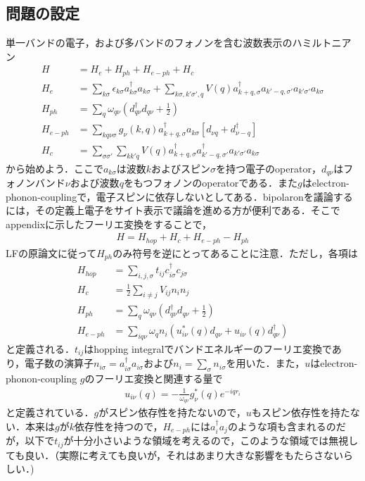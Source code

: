 \documentclass[a4j]{jarticle}
\begin{document}
\subsection{問題の設定}
単一バンドの電子，および多バンドのフォノンを含む波数表示のハミルトニアン
\begin{align}
 H&=H_e+H_{ph}+H_{e-ph}+H_c \\
 H_e&=\sum_{k\sigma}\epsilon_{k\sigma}a^{\dagger}_{k\sigma}a_{k\sigma}+\sum_{k\sigma,k'\sigma',q}V(q)a^{\dagger}_{k+q,\sigma}a_{k'-q,\sigma'}a_{k'\sigma'}a_{k\sigma} \\
 H_{ph}&=\sum_{q}\omega_{q\nu}\left(d^{\dagger}_{q\nu}d_{q\nu}+\frac{1}{2}\right) \\ 
　H_{e-ph}&=\sum_{kq\nu\sigma}g_{\nu}(k,q)a^{\dagger}_{k+q,\sigma}a_{k\sigma}\left[d_{\nu q}+d^{\dagger}_{\nu -q}\right] \\
H_c&=\sum_{\sigma\sigma'}\sum_{kk'q}V(q)a^{\dagger}_{k+q,\sigma}a^{\dagger}_{k'-q,\sigma'}a_{k'\sigma'}a_{k\sigma}
\end{align}
から始めよう．ここで$a_{k\sigma}$は波数$k$およびスピン$\sigma$を持つ電子のoperator，$d_{q\nu}$はフォノンバンド$\nu$および波数$q$をもつフォノンのoperatorである．また$g$はelectron-phonon-couplingで，電子スピンに依存しないとしてある．bipolaronを議論するには，その定義上電子をサイト表示で議論を進める方が便利である．そこでappendixに示したフーリエ変換をすることで，
\begin{align}
 H=H_{hop}+H_{c}+H_{e-ph}-H_{ph} \label{Hstart}
\end{align}
LFの原論文に従って$H_{ph}$のみ符号を逆にとってあることに注意．ただし，各項は
\begin{align}
 H_{hop}&=\sum_{i,j,\sigma}t_{ij}c^{\dagger}_{i\sigma}c_{j\sigma} \\
 H_{c}&=\frac{1}{2}\sum_{i\neq j}V_{ij}n_in_j \\
 H_{ph}&=\sum_{q}\omega_{q\nu}\left(d^{\dagger}_{q\nu}d_{q\nu}+\frac{1}{2}\right) \\
 H_{e-ph}&=\sum_{iq\nu}\omega_qn_i\left(u_{i\nu}^*(q)d_{q\nu}+u_{i\nu}(q)d^{\dagger}_{q\nu}\right)
\end{align}
と定義される．$t_{ij}$はhopping integralでバンドエネルギーのフーリエ変換であり，電子数の演算子$n_{i\sigma}=a^{\dagger}_{i\sigma}a_{i\sigma}$および$n_i=\sum_{\sigma}n_{i\sigma}$を用いた．また，$u$はelectron-phonon-coupling $g$のフーリエ変換と関連する量で
\begin{align}
 u_{i\nu}(q)=-\frac{1}{\omega_{q\nu}}g_{\nu}^*(q)e^{-iqr_i}
\end{align}
と定義されている．$g$がスピン依存性を持たないので，$u$もスピン依存性を持たない．本来は$g$が$k$依存性を持つので，$H_{e-ph}$には$a^{\dagger}_ia_j$のような項も含まれるのだが，以下で$t_{ij}$が十分小さいような領域を考えるので，このような領域では無視しても良い．（実際に考えても良いが，それはあまり大きな影響をもたらさないらしい．)
\end{document}
